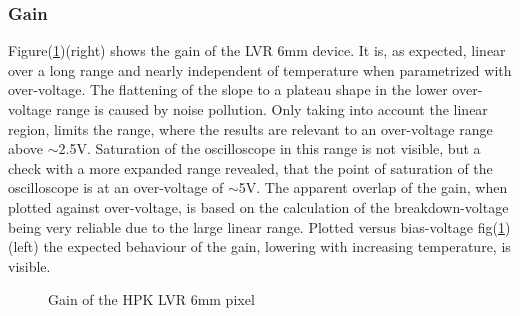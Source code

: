 \documentclass[12pt,article,type=msc,colorback,accentcolor=tud9c]{tudthesis}
\begin{document}
\subsubsection{Gain}
\label{subsubsec:LVR6Gain}
Figure(\ref{fig:LVR6_Gain})(right) shows the gain of the LVR 6mm device. It is, as expected, linear over a long range and nearly independent of temperature when parametrized with over-voltage. The flattening of the slope to a plateau shape in the lower over-voltage range is caused by noise pollution. Only taking into account the linear region, limits the range, where the results are relevant to an over-voltage range above $\sim$2.5V. Saturation of the oscilloscope in this range is not visible, but a check with a more expanded range revealed, that the point of saturation of the oscilloscope is at an over-voltage of $\sim$5V. The apparent overlap of the gain, when plotted against over-voltage, is based on the calculation of the breakdown-voltage being very reliable due to the large linear range. Plotted versus bias-voltage fig(\ref{fig:LVR6_Gain})(left) the expected behaviour of the gain, lowering with increasing temperature, is visible. 
\begin{figure}[h]
\begin{centering}
\caption[LCT5 LVR 6mm gain]{Gain of the HPK LVR 6mm pixel}
\label{fig:LVR6_Gain}
\end{centering}
\end{figure}
\end{document}
